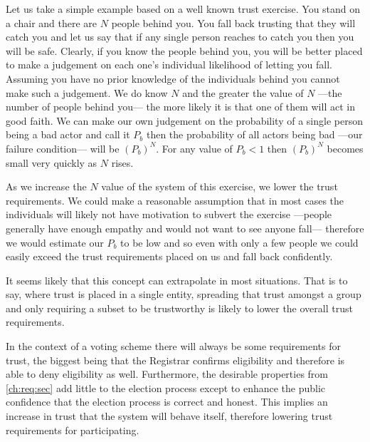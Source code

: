 Let us take a simple example based on a well known trust exercise. You stand on a chair and there are $N$ people behind you. You fall back trusting that they will catch you and let us say that if any single person reaches to catch you then you will be safe. Clearly, if you know the people behind you, you will be better placed to make a judgement on each one's individual likelihood of letting you fall. Assuming you have no prior knowledge of the individuals behind you cannot make such a judgement. We do know $N$ and the greater the value of $N$ ---the number of people behind you--- the more likely it is that one of them will act in good faith. We can make our own judgement on the probability of a single person being a bad actor and call it $P_b$ then the probability of all actors being bad ---our failure condition--- will be $(P_b)^N$. For any value of $P_b < 1$ then $(P_b)^N$ becomes small very quickly as $N$ rises.

As we increase the $N$ value of the system of this exercise, we lower the trust requirements. We could make a reasonable assumption that in most cases the individuals will likely not have motivation to subvert the exercise ---people generally have enough empathy and would not want to see anyone fall--- therefore we would estimate our $P_b$ to be low and so even with only a few people we could easily exceed the trust requirements placed on us and fall back confidently.

It seems likely that this concept can extrapolate in most situations. That is to say, where trust is placed in a single entity, spreading that trust amongst a group and only requiring a subset to be trustworthy is likely to lower the overall trust requirements.

In the context of a voting scheme there will always be some requirements for trust, the biggest being that the Registrar confirms eligibility and therefore is able to deny eligibility as well. Furthermore, the desirable properties from \autoref{ch:req:sec} add little to the election process except to enhance the public confidence that the election process is correct and honest. This implies an increase in trust that the system will behave itself, therefore lowering trust requirements for participating.